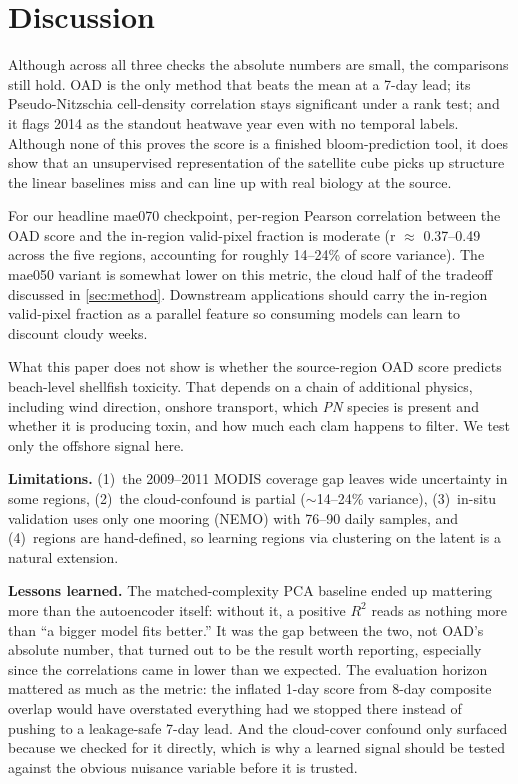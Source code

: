 \documentclass[10pt,twocolumn,letterpaper]{article}
\begin{document}
\FloatBarrier

\section{Discussion}
\label{sec:discussion}

Although across all three checks the absolute numbers are small, the comparisons still hold. OAD is the only method that beats the mean at a 7-day lead; its Pseudo-Nitzschia cell-density correlation stays significant under a rank test; and it flags 2014 as the standout heatwave year even with no temporal labels. Although none of this proves the score is a finished bloom-prediction tool, it does show that an unsupervised representation of the satellite cube picks up structure the linear baselines miss and can line up with real biology at the source.

For our headline mae070 checkpoint, per-region Pearson correlation between the OAD score and the in-region valid-pixel fraction is moderate (r $\approx$ 0.37--0.49 across the five regions, accounting for roughly 14--24\% of score variance). The mae050 variant is somewhat lower on this metric, the cloud half of the tradeoff discussed in \cref{sec:method}. Downstream applications should carry the in-region valid-pixel fraction as a parallel feature so consuming models can learn to discount cloudy weeks.

What this paper does not show is whether the source-region OAD score predicts beach-level shellfish toxicity. That depends on a chain of additional physics, including wind direction, onshore transport, which \textit{PN} species is present and whether it is producing toxin, and how much each clam happens to filter. We test only the offshore signal here.

\textbf{Limitations.} (1)~the 2009--2011 MODIS coverage gap leaves wide uncertainty in some regions, (2)~the cloud-confound is partial ($\sim$14--24\% variance), (3)~in-situ validation uses only one mooring (NEMO) with 76--90 daily samples, and (4)~regions are hand-defined, so learning regions via clustering on the latent is a natural extension.

\textbf{Lessons learned.} The matched-complexity PCA baseline ended up mattering more than the autoencoder itself: without it, a positive $R^2$ reads as nothing more than ``a bigger model fits better.'' It was the gap between the two, not OAD's absolute number, that turned out to be the result worth reporting, especially since the correlations came in lower than we expected. The evaluation horizon mattered as much as the metric: the inflated 1-day score from 8-day composite overlap would have overstated everything had we stopped there instead of pushing to a leakage-safe 7-day lead. And the cloud-cover confound only surfaced because we checked for it directly, which is why a learned signal should be tested against the obvious nuisance variable before it is trusted.
\end{document}
